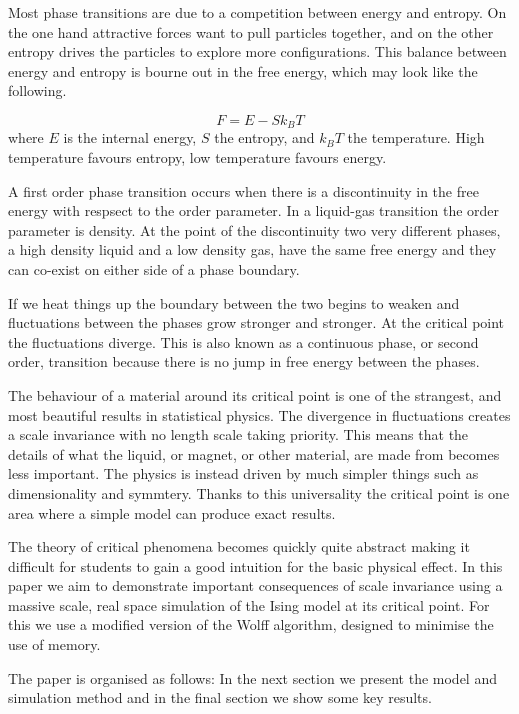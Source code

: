 \documentclass[aps,prl,reprint,groupedaddress, showpacs]{revtex4-1}
\begin{document}
Most phase transitions are due to a competition between energy and entropy. On the one hand attractive forces want to pull particles together, and on the other entropy drives the particles to explore more configurations. This balance between energy and entropy is bourne out in the free energy, which may look like the following.

\begin{equation}
F = E - S k_B T
\end{equation}
where $E$ is the internal energy, $S$ the entropy, and $k_B T$ the temperature. High temperature favours entropy, low temperature favours energy.

A first order phase transition occurs when there is a discontinuity in the free energy with respsect to the order parameter. In a liquid-gas transition the order parameter is density. At the point of the discontinuity two very different phases, a high density liquid and a low density gas, have the same free energy and they can co-exist on either side of a phase boundary.

If we heat things up the boundary between the two begins to weaken and fluctuations between the phases grow stronger and stronger. At the critical point the fluctuations diverge. This is also known as a continuous phase, or second order, transition because there is no jump in free energy between the phases.


The behaviour of a material around its critical point is one of the strangest, and most beautiful results in statistical physics. The divergence in fluctuations creates a scale invariance with no length scale taking priority. This means that the details of what the liquid, or magnet, or other material, are made from becomes less important. The physics is instead driven by much simpler things such as dimensionality and symmtery. Thanks to this universality the critical point is one area where a simple model can produce exact results.

The theory of critical phenomena becomes quickly quite abstract making it difficult for students to gain a good intuition for the basic physical effect. In this paper we aim to demonstrate important consequences of scale invariance using a massive scale, real space simulation of the Ising model at its critical point. For this we use a modified version of the Wolff algorithm, designed to minimise the use of memory.

The paper is organised as follows: In the next section we present the model and simulation method and in the final section we show some key results.
\end{document}

